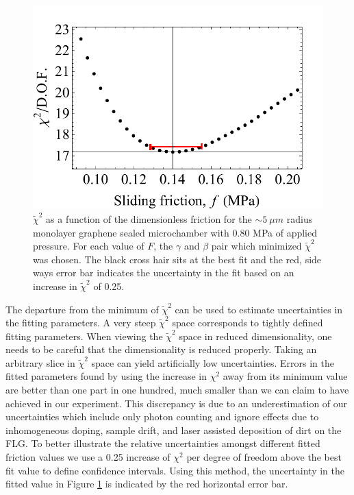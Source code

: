 \begin{figure}
	\begin{center}
	\includegraphics{Figs_Fit/2013-09-05_Fit_101psi_ErrorBar_ForThesis.pdf}
	\end{center}
	\caption[$\tilde{\chi}^2$ as a function of the dimensionless friction]{\label{fig:Fit:chispace}
	$\tilde{\chi}^2$ as a function of the dimensionless friction for the $\sim 5 \ \mu m$ radius monolayer graphene sealed microchamber with 0.80 MPa of applied pressure.
	For each value of $F$, the $\gamma$ and $\beta$ pair which minimized $\tilde{\chi}^2$ was chosen.
	The black cross hair sits at the best fit and the red, side ways error bar indicates the uncertainty in the fit based on an increase in $\tilde{\chi}^2$ of 0.25.
	}
\end{figure}

The departure from the minimum of $\tilde{\chi}^2$ can be used to estimate uncertainties in the fitting parameters.
A very steep $\tilde{\chi}^2$ space corresponds to tightly defined fitting parameters.
When viewing the $\tilde{\chi}^2$ space in reduced dimensionality, one needs to be careful that the dimensionality is reduced properly.
Taking an arbitrary slice in $\tilde{\chi}^2$ space can yield artificially low uncertainties.
Errors in the fitted parameters found by using the increase in $\chi^2$ away from its minimum value \cite{Press2007} are better than one part in one hundred, much smaller than we can claim to have achieved in our experiment.
This discrepancy is due to an underestimation of our uncertainties which include only photon counting and ignore effects due to inhomogeneous doping, sample drift, and laser assisted deposition of dirt on the FLG.
To better illustrate the relative uncertainties amongst different fitted friction values we use a 0.25 increase of $\chi^2$ per degree of freedom above the best fit value to define confidence intervals.
Using this method, the uncertainty in the fitted value in Figure \ref{fig:Fit:chispace} is indicated by the red horizontal error bar.